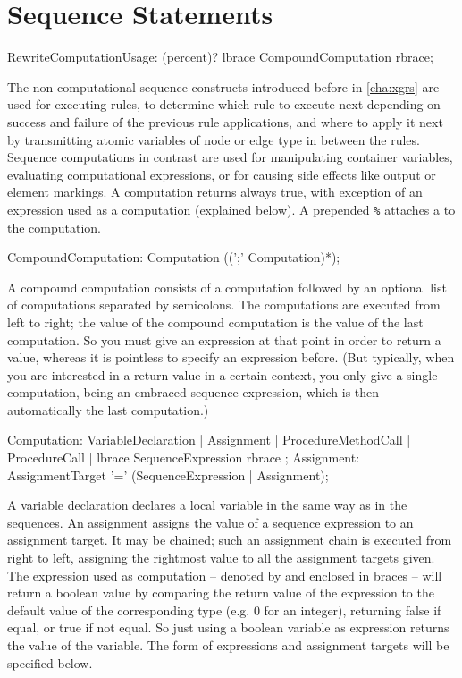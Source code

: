 \section{Sequence Statements} \label{sec:seqcomp}

\begin{rail} 
  RewriteComputationUsage: (percent)? lbrace CompoundComputation rbrace; 
\end{rail}

The non-computational sequence constructs introduced before in \ref{cha:xgrs} are used for executing rules, to determine which rule to execute next depending on success and failure of the previous rule applications, and where to apply it next by transmitting atomic variables of node or edge type in between the rules.
Sequence computations in contrast are used for manipulating container variables, evaluating computational expressions, or for causing side effects like output or element markings.
A computation returns always true, with exception of an expression used as a computation (explained below).
A prepended \texttt{\%} attaches a  to the computation.

\begin{rail} 
  CompoundComputation: Computation ((';' Computation)*); 
\end{rail}

A compound computation consists of a computation followed by an optional list of computations separated by semicolons.
The computations are executed from left to right;
the value of the compound computation is the value of the last computation.
So you must give an expression at that point in order to return a value, 
whereas it is pointless to specify an expression before.
(But typically, when you are interested in a return value in a certain context, you only give a single computation, being an embraced sequence expression, which is then automatically the last computation.)

\begin{rail} 
  Computation:
     VariableDeclaration |
     Assignment |
     ProcedureMethodCall |
     ProcedureCall |
     lbrace SequenceExpression rbrace
  ;
	Assignment:	AssignmentTarget '=' (SequenceExpression | Assignment); 
\end{rail}

A variable declaration declares a local variable in the same way as in the sequences.
An assignment assigns the value of a sequence expression to an assignment target.
It may be chained; such an assignment chain is executed from right to left, assigning the rightmost value to all the assignment targets given.
The expression used as computation -- denoted by and enclosed in braces -- will return a boolean value by comparing the return value of the expression to the default value of the corresponding type (e.g. 0 for an integer), returning false if equal, or true if not equal.
So just using a boolean variable as expression returns the value of the variable.
The form of expressions and assignment targets will be specified below.

